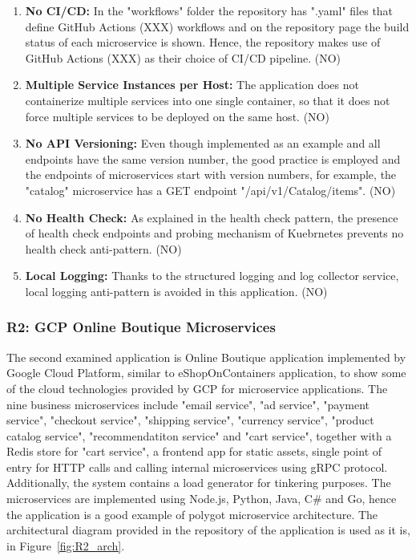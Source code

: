 \documentclass{Configuration_Files/PoliMi3i_thesis}
\begin{document}
\begin{enumerate}
    \item \textbf{No CI/CD:} In the "workflows" folder the repository has ".yaml" files that define GitHub Actions (XXX) workflows and on the repository page the build status of each microservice is shown.
    Hence, the repository makes use of GitHub Actions (XXX) as their choice of CI/CD pipeline. (NO)
    
    \item \textbf{Multiple Service Instances per Host:} The application does not containerize multiple services into one single container, so that it does not force multiple services to be deployed on the same host. (NO)
    
    \item \textbf{No API Versioning:} Even though implemented as an example and all endpoints have the same version number, the good practice is employed and the endpoints of microservices start with version numbers, for example, the "catalog" microservice has a GET endpoint "/api/v1/Catalog/items". (NO) 
    
    \item \textbf{No Health Check:} As explained in the health check pattern, the presence of health check endpoints and probing mechanism of Kuebrnetes prevents no health check anti-pattern. (NO)
    
    \item \textbf{Local Logging:} Thanks to the structured logging and log collector service, local logging anti-pattern is avoided in this application. (NO)
\end{enumerate}

\subsubsection{R2: GCP Online Boutique Microservices}
\label{subsubsec:R2}

The second examined application is Online Boutique application implemented by Google Cloud Platform, similar to eShopOnContainers application, to show some of the cloud technologies provided by GCP for microservice applications.
The nine business microservices include "email service", "ad service", "payment service", "checkout service", "shipping service", "currency service", "product catalog service", "recommendatiton service" and "cart service", together with a Redis store for "cart service", a frontend app for static assets, single point of entry for HTTP calls and calling internal microservices using gRPC protocol.
Additionally, the system contains a load generator for tinkering purposes.
The microservices are implemented using Node.js, Python, Java, C# and Go, hence the application is a good example of polygot microservice architecture.
The architectural diagram provided in the repository of the application is used as it is, in Figure~\ref{fig:R2_arch}.
\end{document}
